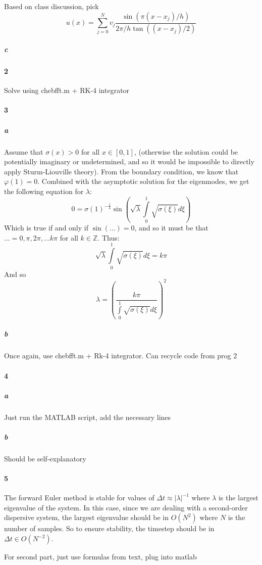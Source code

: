 \documentclass{article}
\begin{document}
Based on class discussion, pick 
\[u(x) = \sum \limits_{j=0}^N v_j \frac{\sin(\pi(x - x_j) / h)}{2 \pi / h \tan((x - x_j)/2)}\]

\subparagraph{c}


\paragraph{2}

Solve using chebfft.m + RK-4 integrator

\paragraph{3}

\subparagraph{a}

Assume that $\sigma(x) > 0$ for all $x \in [0,1]$, (otherwise the solution could be potentially imaginary or undetermined, and so it would be impossible to directly apply Sturm-Liouville theory).  From the boundary condition, we know that $\varphi(1) = 0$.  Combined with the asymptotic solution for the eigenmodes, we get the following equation for $\lambda$:
\[ 0 = \sigma(1)^{-\frac{1}{4}} \sin \left( \sqrt{ \lambda } \int \limits_0^1 \sqrt{ \sigma(\xi) } d \xi \right) \]
Which is true if and only if $\sin(...) = 0$, and so it must be that $... = 0, \pi, 2\pi, ... k \pi$ for all $k \in \mathbb{Z}$.  Thus:
\[ \sqrt{\lambda} \int \limits_0^1 \sqrt{\sigma(\xi)} d \xi = k \pi \]
And so
\[ \lambda = \left( \frac{k \pi}{ \int \limits_0^1 \sqrt{ \sigma(\xi) } d \xi } \right) ^2 \]

\subparagraph{b}

Once again, use chebfft.m + Rk-4 integrator.  Can recycle code from prog 2

\paragraph{4}

\subparagraph{a}

Just run the MATLAB script, add the necessary lines

\subparagraph{b}

Should be self-explanatory

\paragraph{5}

The forward Euler method is stable for values of $\Delta t \approx | \lambda |^{-1}$ where $\lambda$ is the largest eigenvalue of the system.  In this case, since we are dealing with a second-order dispersive system, the largest eigenvalue should be in $O(N^2)$ where $N$ is the number of samples.  So to ensure stability, the timestep should be in $\Delta t \in O(N^{-2})$.


For second part, just use formulas from text, plug into matlab
\end{document}
